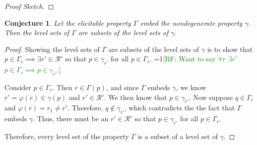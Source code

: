 \documentclass[12pt]{article}
\newcommand{\Comments}{1}
\newcommand{\mynote}[2]{\ifnum\Comments=1\textcolor{#1}{#2}\fi}
\newcommand{\raf}[1]{\mynote{green}{[RF: #1]}}
\newcommand{\R}{\mathcal{R}}
\newcommand{\inter}[1]{\mathring{#1}}%
\newcommand{\trim}{\mathrm{trim}}
\newcommand{\strip}{\mathrm{strip}}
\newtheorem{conjecture}{Conjecture}
\begin{document}
\begin{proof}[Proof Sketch]
%		
%		
	
\end{proof}


\begin{conjecture}\label{conj:lev-sets-subsets}
	Let the elicitable property $\Gamma$ embed the nondegenerate property $\gamma$.
	Then the level sets of $\Gamma$ are subsets of the level sets of $\gamma$.
\end{conjecture}

\begin{proof}
	Showing the level sets of $\Gamma$ are subsets of the level sets of $\gamma$ is to show that $p \in \Gamma_r \implies \exists r' \in \R'$ so that $p \in \gamma_{r'}$ for all $p \in \Gamma_r$.
    \raf{Want to say $\forall r$ $\exists r'$ $p \in \Gamma_r \implies p \in \gamma_{r'}$.}
    
	Consider $p \in \Gamma_r$.
	Then $r \in \Gamma(p)$, and since $\Gamma$ embeds $\gamma$, we know $ r' = \varphi(r) \in \gamma(p)$ and $r' \in \R'$.
	We then know that $p \in \gamma_{r'}$.
	Now suppose $q \in \Gamma_r$ and $\varphi(r) = r_1 \neq r'$.
	Therefore, $q \not \in \gamma_{r'}$, which contradicts the the fact that $\Gamma$ embeds $\gamma$.
	Thus, there must be an $r' \in \R'$ so that $p \in \gamma_{r'}$ for all $p \in \Gamma_r$.
	
	Therefore, every level set of the property $\Gamma$ is a subset of a level set of $\gamma$.
\end{proof}
\end{document}

